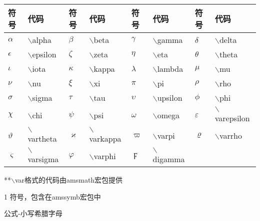 \documentclass[UTF8,fontset=ubuntu]{ctexbook}
\begin{document}
\begin{threeparttable}
\begin{tabular}{l l l l l l l l}
	\hline
	符号 & 代码 & 符号 & 代码 & 符号 & 代码 & 符号 & 代码\\
	\hline
	$\alpha$ & $\backslash$alpha & $\beta$ & $\backslash$beta & $\gamma$ & $\backslash$gamma & $\delta$ & $\backslash$delta\\
	$\epsilon$ & $\backslash$epsilon & $\zeta$ & $\backslash$zeta & $\eta$ & $\backslash$eta & $\theta$ & $\backslash$theta\\
	$\iota$ & $\backslash$iota & $\kappa$ & $\backslash$kappa & $\lambda$ & $\backslash$lambda & $\mu$ & $\backslash$mu\\
	$\nu$ & $\backslash$nu & $\xi$ & $\backslash$xi & $\pi$ & $\backslash$pi & $\rho$ & $\backslash$rho\\
	$\sigma$ & $\backslash$sigma & $\tau$ & $\backslash$tau & $\upsilon$ & $\backslash$upsilon & $\phi$ & $\backslash$phi\\
	$\chi$ & $\backslash$chi & $\psi$ & $\backslash$psi & $\omega$ & $\backslash$omega & $\varepsilon$ & $\backslash$varepsilon\\
	$\vartheta$ & $\backslash$vartheta & $\varkappa$ & $\backslash$varkappa\tnote{1} & $\varpi$ & $\backslash$varpi & $\varrho$ & $\backslash$varrho\tnote{1}\\
	$\varsigma$ & $\backslash$varsigma & $\varphi$ & $\backslash$varphi & $\digamma$ & $\backslash$digamma\tnote{1}\\
	\hline
\end{tabular}
**$\backslash$var格式的代码由amsmath宏包提供
\begin{tablenotes}
	\item[1] \AMS 符号，包含在amssymb宏包中
\end{tablenotes}
\caption{公式-小写希腊字母}
\end{threeparttable}
\end{document}
